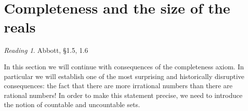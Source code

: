 \documentclass[11pt,oneside]{amsbook}
\newcommand{\set}[1]{\left\{\,#1\,\right\}}
\newcommand{\N}{\mathbb N}
\theoremstyle{definition}
\newtheorem{exerc}{Exercise}[section]
\theoremstyle{plain}
\theoremstyle{definition}
\theoremstyle{remark}
\newtheorem*{reading}{Reading}
\numberwithin{equation}{section}
\numberwithin{figure}{section}
\begin{document}

%
%


\newpage
\section{Completeness and the size of the reals}

\begin{reading}
  Abbott, \S 1.5, 1.6
\end{reading}

In this section we will continue with consequences of the completeness axiom. In particular we will establish one of the most surprising and historically disruptive consequences: the fact that there are more irrational numbers than there are rational numbers! In order to make this statement precise, we need to introduce the notion of countable and uncountable sets.
\end{document}
